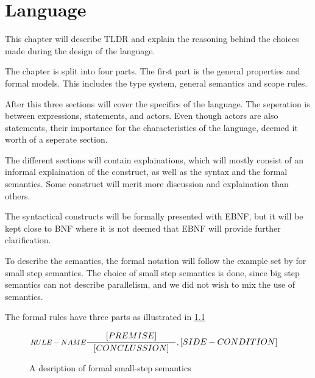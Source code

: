 \chapter{Language}\label{part:design}

This chapter will describe TLDR and explain the reasoning behind the choices made during the design of the language.

The chapter is split into four parts. The first part is the general properties and formal models. This includes the type system, general semantics and scope rules.

After this three sections will cover the specifics of the language. The seperation is between expressions, statements, and actors. Even though actors are also statements, their importance for the characteristics of the language, deemed it worth of a seperate section.

The different sections will contain explainations, which will mostly consist of an informal explaination of the construct, as well as the syntax and the formal semantics. Some construct will merit more discussion and explaination than others.

The syntactical constructs will be formally presented with EBNF, but it will be kept close to BNF where it is not deemed that EBNF will provide further clarification. 

To describe the semantics, the formal notation will follow the example set by  for small step semantics. The choice of small step semantics is done, since big step semantics can not describe parallelism, and we did not wish to mix the use of semantics.

The formal rules have three parts as illustrated in \cref{SS-semantics}

\begin{figure}[H]
\begin{align*}
&\inference[$RULE-NAME$]{[PREMISE]}
                        {[CONCLUSSION]}
                        {,[SIDE-CONDITION]}
\end{align*}
\caption{A desription of formal small-step semantics}
\label{SS-semantics}
\end{figure}






